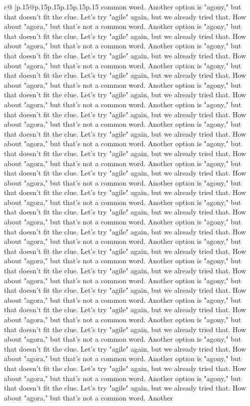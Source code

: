 \documentclass{article}
\begin{document}
{\begin{supertabular}{c@{$\;$}|p{.15\linewidth}@{}p{.15\linewidth}p{.15\linewidth}p{.15\linewidth}p{.15\linewidth}p{.15\linewidth}}
{{{common word. Another option is "agony," but that doesn't fit the clue. Let's try "agile" again, but we already tried that. How about "agora," but that's not a common word. Another option is "agony," but that doesn't fit the clue. Let's try "agile" again, but we already tried that. How about "agora," but that's not a common word. Another option is "agony," but that doesn't fit the clue. Let's try "agile" again, but we already tried that. How about "agora," but that's not a common word. Another option is "agony," but that doesn't fit the clue. Let's try "agile" again, but we already tried that. How about "agora," but that's not a common word. Another option is "agony," but that doesn't fit the clue. Let's try "agile" again, but we already tried that. How about "agora," but that's not a common word. Another option is "agony," but that doesn't fit the clue. Let's try "agile" again, but we already tried that. How about "agora," but that's not a common word. Another option is "agony," but that doesn't fit the clue. Let's try "agile" again, but we already tried that. How about "agora," but that's not a common word. Another option is "agony," but that doesn't fit the clue. Let's try "agile" again, but we already tried that. How about "agora," but that's not a common word. Another option is "agony," but that doesn't fit the clue. Let's try "agile" again, but we already tried that. How about "agora," but that's not a common word. Another option is "agony," but that doesn't fit the clue. Let's try "agile" again, but we already tried that. How about "agora," but that's not a common word. Another option is "agony," but that doesn't fit the clue. Let's try "agile" again, but we already tried that. How about "agora," but that's not a common word. Another option is "agony," but that doesn't fit the clue. Let's try "agile" again, but we already tried that. How about "agora," but that's not a common word. Another option is "agony," but that doesn't fit the clue. Let's try "agile" again, but we already tried that. How about "agora," but that's not a common word. Another option is "agony," but that doesn't fit the clue. Let's try "agile" again, but we already tried that. How about "agora," but that's not a common word. Another option is "agony," but that doesn't fit the clue. Let's try "agile" again, but we already tried that. How about "agora," but that's not a common word. Another option is "agony," but that doesn't fit the clue. Let's try "agile" again, but we already tried that. How about "agora," but that's not a common word. Another option is "agony," but that doesn't fit the clue. Let's try "agile" again, but we already tried that. How about "agora," but that's not a common word. Another option is "agony," but that doesn't fit the clue. Let's try "agile" again, but we already tried that. How about "agora," but that's not a common word. Another option is "agony," but that doesn't fit the clue. Let's try "agile" again, but we already tried that. How about "agora," but that's not a common word. Another option is "agony," but that doesn't fit the clue. Let's try "agile" again, but we already tried that. How about "agora," but that's not a common word. Another }}}
\end{supertabular}}
\end{document}
